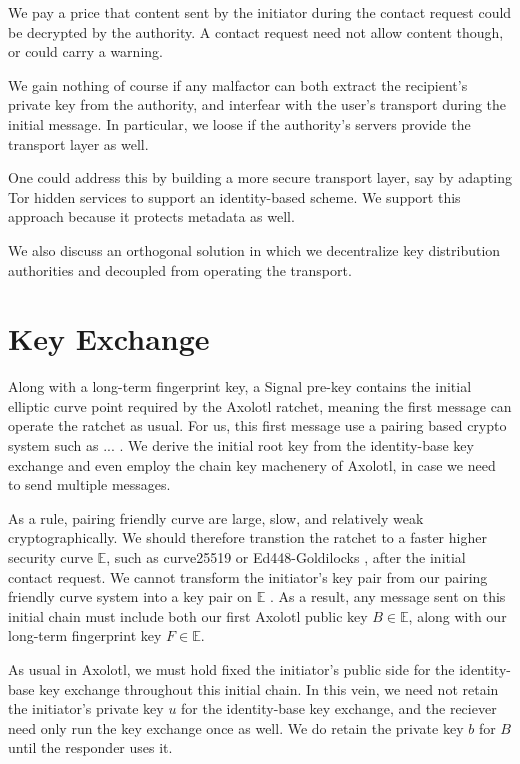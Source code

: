 \documentclass[twoside,letterpaper]{sig-alternate}
\begin{document}
We pay a price that content sent by the initiator during
 the contact request could be decrypted by the authority.
A contact request need not allow content though, or
 could carry a warning.

We gain nothing of course if any malfactor can both
 extract the recipient's private key from the authority, and
 interfear with the user's transport during the initial message.
In particular, we loose if the authority's servers provide
 the transport layer as well. 

One could address this by building a more secure transport layer,
say by adapting Tor hidden services to support an identity-based scheme.
We support this approach because it protects metadata as well.

We also discuss an orthogonal solution in which we decentralize key
distribution authorities and decoupled from operating the transport.

\section{Key Exchange} 

Along with a long-term fingerprint key,
a Signal pre-key contains the initial elliptic curve point required
by the Axolotl ratchet, meaning
 the first message can operate the ratchet as usual.  
%
For us, this first message use a pairing based crypto system
 such as ... \cite{}.
We derive the initial root key from the identity-base key
exchange and even employ the chain key machenery of Axolotl,
 in case we need to send multiple messages. 

As a rule, pairing friendly curve are large, slow, and relatively
 weak cryptographically.
We should therefore transtion the ratchet to a faster higher security
curve $\mathbb{E}$, such as curve25519 \cite{} or
 Ed448-Goldilocks \cite{}, after the initial contact request.
We cannot transform the initiator's key pair from
 our pairing friendly curve system 
into a key pair on $\mathbb{E}$ \cite{??no_homomorphism??}.
As a result, any message sent on this initial chain must include both
 our first Axolotl public key $B \in \mathbb{E}$, along with
 our long-term fingerprint key $F \in \mathbb{E}$.

As usual in Axolotl, we must hold fixed the initiator's public side
 for the identity-base key exchange throughout this initial chain.
In this vein, we need not retain the initiator's private key $u$ for
 the identity-base key exchange, and
 the reciever need only run the key exchange once as well.
We do retain the private key $b$ for $B$ until the responder uses it.
\end{document}
